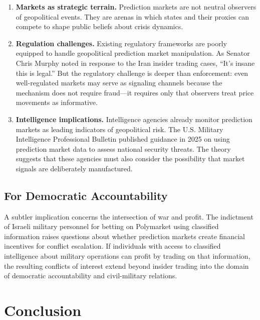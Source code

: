 \documentclass[12pt]{article}
\begin{document}
\begin{enumerate}
    \item \textbf{Markets as strategic terrain.} Prediction markets are not neutral observers of geopolitical events. They are arenas in which states and their proxies can compete to shape public beliefs about crisis dynamics.
    \item \textbf{Regulation challenges.} Existing regulatory frameworks are poorly equipped to handle geopolitical prediction market manipulation. As Senator Chris Murphy noted in response to the Iran insider trading cases, ``It's insane this is legal.'' But the regulatory challenge is deeper than enforcement: even well-regulated markets may serve as signaling channels because the mechanism does not require fraud---it requires only that observers treat price movements as informative.
    \item \textbf{Intelligence implications.} Intelligence agencies already monitor prediction markets as leading indicators of geopolitical risk. The U.S. Military Intelligence Professional Bulletin published guidance in 2025 on using prediction market data to assess national security threats. The theory suggests that these agencies must also consider the possibility that market signals are deliberately manufactured.
\end{enumerate}

\subsection{For Democratic Accountability}

A subtler implication concerns the intersection of war and profit. The indictment of Israeli military personnel for betting on Polymarket using classified information raises questions about whether prediction markets create financial incentives for conflict escalation. If individuals with access to classified intelligence about military operations can profit by trading on that information, the resulting conflicts of interest extend beyond insider trading into the domain of democratic accountability and civil-military relations.


\section{Conclusion}\label{sec:conclusion}
\end{document}
